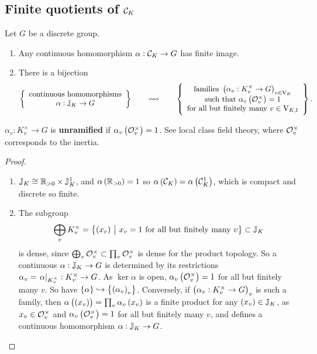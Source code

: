 \subsection{Finite quotients of \texorpdfstring{$ \mathcal{C}_K $}{idele class group}}

\begin{proposition}
\label{prop:8.1}
Let $ G $ be a discrete group.
\begin{enumerate}
\item Any continuous homomorphism $ \alpha : \mathcal{C}_K \to G $ has finite image.
\item There is a bijection
$$ \correspondence{\text{continuous homomorphisms} \\ \alpha : \JJ_K \to G}{\text{families} \ \br{\alpha_v : K_v^\times \to G}_{v \in \V_K} \\ \text{such that} \ \alpha_v\br{\OOO_v^\times} = 1 \\ \text{for all but finitely many} \ v \in \V_{K, \f}}. $$
\end{enumerate}
\end{proposition}

\begin{notation*}
$ \alpha_v : K_v^\times \to G $ is \textbf{unramified} if $ \alpha_v\br{\OOO_v^\times} = 1 $. See local class field theory, where $ \mathcal{O}_v^\times $ corresponds to the inertia.
\end{notation*}

\begin{proof}
\hfill
\begin{enumerate}
\item $ \mathbb{J}_K \cong \mathbb{R}_{> 0} \times \mathbb{J}_K^1 $, and $ \alpha\br{\RR_{> 0}} = 1 $ so $ \alpha\br{\CCC_K} = \alpha\br{\CCC_K^1} $, which is compact and discrete so finite.
\item The subgroup
$$ \bigoplus_v K_v^\times = \cbr{\br{x_v} \st x_v = 1 \ \text{for all but finitely many} \ v} \subset \JJ_K $$
is dense, since $ \bigoplus_v \mathcal{O}_v^\times \subset \prod_v \mathcal{O}_v^\times $ is dense for the product topology. So a continuous $ \alpha : \mathbb{J}_K \to G $ is determined by its restrictions $ \alpha_v = \left. \alpha \right|_{K_v^\times} : K_v^\times \to G $. As $ \ker \alpha $ is open, $ \alpha_v\br{\OOO_v^\times} = 1 $ for all but finitely many $ v $. So have $ \cbr{\alpha} \hookrightarrow \cbr{\br{\alpha_v}_v} $. Conversely, if $ \br{\alpha_v : K_v^\times \to G}_v $ is such a family, then $ \alpha\br{\br{x_v}} = \prod_v \alpha_v\br{x_v} $ is a finite product for any $ \br{x_v} \in \JJ_K $, as $ x_v \in \mathcal{O}_v^\times $ and $ \alpha_v\br{\OOO_v^\times} = 1 $ for all but finitely many $ v $, and defines a continuous homomorphism $ \alpha : \mathbb{J}_K \to G $.
\end{enumerate}
\end{proof}

